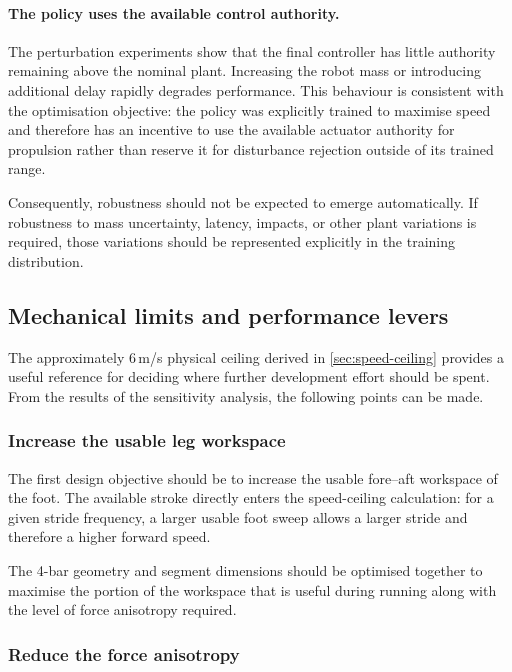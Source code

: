\paragraph{The policy uses the available control authority.}
The perturbation experiments show that the final controller has little authority remaining above the nominal plant.
Increasing the robot mass or introducing additional delay rapidly degrades performance.
This behaviour is consistent with the optimisation objective: the policy was explicitly trained to maximise speed and therefore has an incentive to use the available actuator authority for propulsion rather than reserve it for disturbance rejection outside of its trained range.

Consequently, robustness should not be expected to emerge automatically.
If robustness to mass uncertainty, latency, impacts, or other plant variations is required, those variations should be represented explicitly in the training distribution.

\subsection{Mechanical limits and performance levers}

The approximately 6\,m/s physical ceiling derived in \cref{sec:speed-ceiling} provides a useful reference for deciding where further development effort should be spent.
From the results of the sensitivity analysis, the following points can be made.

\subsubsection{Increase the usable leg workspace}

The first design objective should be to increase the usable fore--aft workspace of the foot.
The available stroke directly enters the speed-ceiling calculation: for a given stride frequency, a larger usable foot sweep allows a larger stride and therefore a higher forward speed.

The 4-bar geometry and segment dimensions should be optimised together to maximise the portion of the workspace that is useful during running along with the level of force anisotropy required.

\subsubsection{Reduce the force anisotropy}

